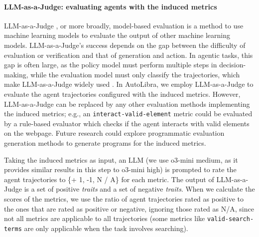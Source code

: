 \paragraph{LLM-as-a-Judge: evaluating agents with the induced metrics}
LLM-as-a-Judge \citep{zheng2023judging},
or more broadly, model-based evaluation
\citep{zhang2019bertscore,celikyilmaz2021evaluationtextgenerationsurvey}
is a method to use machine learning models to evaluate the output of other machine learning models.
LLM-as-a-Judge's success depends on the gap between the difficulty of evaluation or verification and
that of generation and action. 
In agentic tasks, this gap is often large, as the policy model must perform multiple steps in decision-making, while the evaluation model must only
classify the trajectories, which make LLM-as-a-Judge widely used \citep{zhouwebarena,he2024webvoyager,zhousotopia}.
In AutoLibra, we employ LLM-as-a-Judge to
evaluate the agent trajectories configured with the induced metrics. However, LLM-as-a-Judge
can be replaced by any other evaluation methods implementing the induced metrics;
e.g., an \texttt{interact-valid-element} metric
could be evaluated by a rule-based evaluator which checks if the agent
interacts with valid elements on the webpage. Future research could explore
programmatic evaluation generation methods \citep{maeureka} to generate
programs for the induced metrics.

Taking the induced metrics as input, an LLM (we use o3-mini medium,
as it provides similar results in this step to o3-mini high) is prompted to rate the agent trajectories to \{+ 1, -1, N / A\} for each metric. The output of LLM-as-a-Judge is a set of
positive \emph{traits} and a set of negative \emph{traits}. When we calculate the scores of
the metrics, we use the ratio of agent trajectories rated as positive
to the ones that are rated as positive or negative, ignoring those rated as N/A,
since not all metrics are applicable to all trajectories 
(some metrics like \texttt{valid-search-terms} are only applicable when the task
involves searching). 


